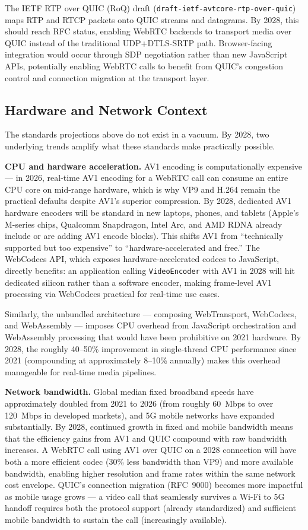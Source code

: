 \documentclass[11pt]{article}
\begin{document}
The IETF RTP over QUIC (RoQ) draft (\texttt{draft-ietf-avtcore-rtp-over-quic})
maps RTP and RTCP packets onto QUIC streams and datagrams. By 2028, this
should reach RFC status, enabling WebRTC backends to transport media over
QUIC instead of the traditional UDP+DTLS-SRTP path. Browser-facing
integration would occur through SDP negotiation rather than new JavaScript
APIs, potentially enabling WebRTC calls to benefit from QUIC's congestion
control and connection migration at the transport layer.

\subsection{Hardware and Network Context}

The standards projections above do not exist in a vacuum. By 2028, two
underlying trends amplify what these standards make practically possible.

\textbf{CPU and hardware acceleration.} AV1 encoding is computationally
expensive --- in 2026, real-time AV1 encoding for a WebRTC call can consume
an entire CPU core on mid-range hardware, which is why VP9 and H.264 remain
the practical defaults despite AV1's superior compression. By 2028, dedicated
AV1 hardware encoders will be standard in new laptops, phones, and tablets
(Apple's M-series chips, Qualcomm Snapdragon, Intel Arc, and AMD RDNA
already include or are adding AV1 encode blocks). This shifts AV1 from
``technically supported but too expensive'' to ``hardware-accelerated and
free.'' The WebCodecs API, which exposes hardware-accelerated codecs to
JavaScript, directly benefits: an application calling
\texttt{VideoEncoder} with AV1 in 2028 will hit dedicated silicon rather than
a software encoder, making frame-level AV1 processing via WebCodecs
practical for real-time use cases.

Similarly, the unbundled architecture --- composing WebTransport, WebCodecs,
and WebAssembly --- imposes CPU overhead from JavaScript orchestration and
WebAssembly processing that would have been prohibitive on 2021 hardware.
By 2028, the roughly 40--50\% improvement in single-thread CPU performance
since 2021 (compounding at approximately 8--10\% annually) makes this
overhead manageable for real-time media pipelines.

\textbf{Network bandwidth.} Global median fixed broadband speeds have
approximately doubled from 2021 to 2026 (from roughly 60~Mbps to over
120~Mbps in developed markets), and 5G mobile networks have expanded
substantially. By 2028, continued growth in fixed and mobile bandwidth
means that the efficiency gains from AV1 and QUIC compound with raw
bandwidth increases. A WebRTC call using AV1 over QUIC on a 2028 connection
will have both a more efficient codec (30\% less bandwidth than VP9) and
more available bandwidth, enabling higher resolution and frame rates within
the same network cost envelope. QUIC's connection migration (RFC~9000)
becomes more impactful as mobile usage grows --- a video call that seamlessly
survives a Wi-Fi to 5G handoff requires both the protocol support (already
standardized) and sufficient mobile bandwidth to sustain the call (increasingly
available).
\end{document}
